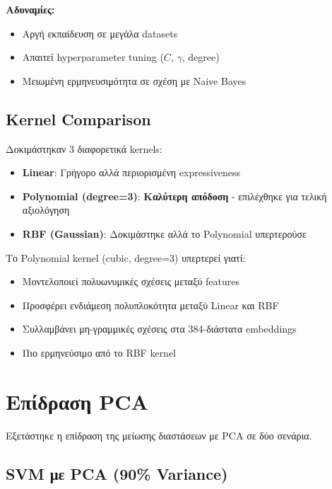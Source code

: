 \documentclass[12pt,a4paper,twoside]{book}
\begin{document}
\textbf{Αδυναμίες:}
\begin{itemize}
    \item Αργή εκπαίδευση σε μεγάλα datasets
    \item Απαιτεί hyperparameter tuning (\(C\), \(\gamma\), degree)
    \item Μειωμένη ερμηνευσιμότητα σε σχέση με Naive Bayes
\end{itemize}

\subsection{Kernel Comparison}

Δοκιμάστηκαν 3 διαφορετικά kernels:

\begin{itemize}
    \item \textbf{Linear}: Γρήγορο αλλά περιορισμένη expressiveness
    \item \textbf{Polynomial (degree=3)}: \textbf{Καλύτερη απόδοση} - επιλέχθηκε για τελική αξιολόγηση
    \item \textbf{RBF (Gaussian)}: Δοκιμάστηκε αλλά το Polynomial υπερτερούσε
\end{itemize}

Το Polynomial kernel (cubic, degree=3) υπερτερεί γιατί:
\begin{itemize}
    \item Μοντελοποιεί πολυωνυμικές σχέσεις μεταξύ features
    \item Προσφέρει ενδιάμεση πολυπλοκότητα μεταξύ Linear και RBF
    \item Συλλαμβάνει μη-γραμμικές σχέσεις στα 384-διάστατα embeddings
    \item Πιο ερμηνεύσιμο από το RBF kernel
\end{itemize}

\section{Επίδραση PCA}

Εξετάστηκε η επίδραση της μείωσης διαστάσεων με PCA σε δύο σενάρια.

\subsection{SVM με PCA (90\% Variance)}
\end{document}
